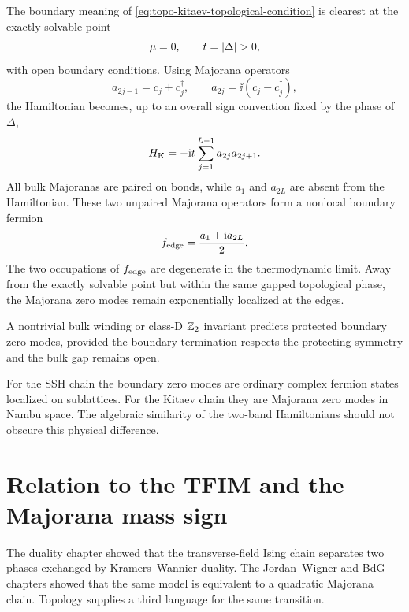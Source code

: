 The boundary meaning of \cref{eq:topo-kitaev-topological-condition} is clearest
at the exactly solvable point
\begin{equation}
\label{eq:topo-kitaev-sweet-spot}
    \mu=0,
    \qquad
    t=\abs{\Delta}>0,
\end{equation}
with open boundary conditions.  Using Majorana operators
\begin{equation}
\label{eq:topo-majorana-definitions}
    a_{2j-1}=c_j+c_j^\dagger,
    \qquad
    a_{2j}=\ii(c_j-c_j^\dagger),
\end{equation}
the Hamiltonian becomes, up to an overall sign convention fixed by the phase of
$\Delta$,
\begin{equation}
\label{eq:topo-kitaev-majorana-sweet-spot}
    H_{\rm K}
    =
    -\mathrm{i} t\sum_{j=1}^{L-1}a_{2j}a_{2j+1}.
\end{equation}
All bulk Majoranas are paired on bonds, while $a_1$ and $a_{2L}$ are absent from
the Hamiltonian.  These two unpaired Majorana operators form a nonlocal boundary
fermion
\begin{equation}
\label{eq:topo-edge-fermion}
    f_{\rm edge}=\frac{a_1+\mathrm{i} a_{2L}}{2}.
\end{equation}
The two occupations of $f_{\rm edge}$ are degenerate in the thermodynamic limit.
Away from the exactly solvable point but within the same gapped topological
phase, the Majorana zero modes remain exponentially localized at the edges.

\begin{principle}
A nontrivial bulk winding or class-D $\mathbb{Z}_2$ invariant predicts protected
boundary zero modes, provided the boundary termination respects the protecting
symmetry and the bulk gap remains open.
\end{principle}

For the SSH chain the boundary zero modes are ordinary complex fermion states
localized on sublattices.  For the Kitaev chain they are Majorana zero modes in
Nambu space.  The algebraic similarity of the two-band Hamiltonians should not
obscure this physical difference.

\section{Relation to the TFIM and the Majorana mass sign}
\label{sec:topo-relation-to-tfim}

The duality chapter showed that the transverse-field Ising chain separates two
phases exchanged by Kramers--Wannier duality.  The Jordan--Wigner and BdG
chapters showed that the same model is equivalent to a quadratic Majorana chain.
Topology supplies a third language for the same transition.

